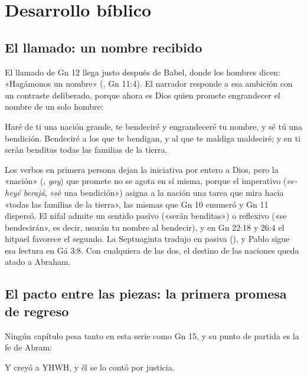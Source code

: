 \section{Desarrollo bíblico}

\subsection{El llamado: un nombre recibido}
El llamado de Gn 12 llega justo después de Babel, donde los hombres dicen: «Hagámonos un nombre» (, Gn 11:4). El narrador responde a esa ambición con un contraste deliberado, porque ahora es Dios quien promete engrandecer el nombre de un solo hombre:

\begin{cita}Haré de ti una nación grande, te bendeciré y engrandeceré tu nombre, y sé tú una bendición. Bendeciré a los que te bendigan, y al que te maldiga maldeciré; y en ti serán benditas todas las familias de la tierra.\end{cita}

Los verbos en primera persona dejan la iniciativa por entero a Dios, pero la «nación» (, \emph{goy}) que promete no se agota en sí misma, porque el imperativo  (\emph{ve-heyé berajá}, «sé una bendición») asigna a la nación una tarea que mira hacia «todas las familias de la tierra», las mismas que Gn 10 enumeró y Gn 11 dispersó. El nifal  admite un sentido pasivo («serán benditas») o reflexivo («se bendecirán», es decir, usarán tu nombre al bendecir), y en Gn 22:18 y 26:4 el hitpael  favorece el segundo. La Septuaginta tradujo en pasiva (), y Pablo sigue esa lectura en Gá 3:8. Con cualquiera de las dos, el destino de las naciones queda atado a Abraham.

\subsection{El pacto entre las piezas: la primera promesa de regreso}
Ningún capítulo pesa tanto en esta serie como Gn 15, y su punto de partida es la fe de Abram:

\begin{cita}Y creyó a YHWH, y él se lo contó por justicia.\end{cita}

